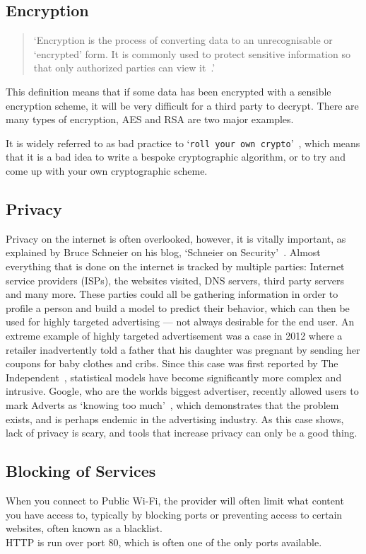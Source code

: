 \subsection{Encryption}
\begin{quotation}
    `Encryption is the process of converting data to an unrecognisable or
    `encrypted' form. It is commonly used to protect sensitive
    information so that only authorized parties can view it~\cite{dictenc}.'
\end{quotation}
This definition means that if some data has been encrypted with a sensible encryption scheme, it will be very difficult for a third party to decrypt.
There are many types of encryption, AES and RSA are two major examples.\par
It is widely referred to as bad practice to `\texttt{roll your own crypto}'~\cite{memtocrypto}, which means that it is a bad idea to write a bespoke cryptographic algorithm, or to try and come up with your own cryptographic scheme.

\subsection{Privacy}
Privacy on the internet is often overlooked, however, it is vitally important, as explained by Bruce Schneier on his blog, `Schneier on Security'~\cite{privacyrulez}. Almost everything that is done on the internet is tracked by multiple parties: Internet service providers (ISPs), the websites visited, DNS servers, third party servers and many more. These parties could all be gathering information in order to profile a person and build a model to predict their behavior, which can then be used for highly targeted advertising --- not always desirable for the end user. An extreme example of highly targeted advertisement was a case in 2012 where a retailer inadvertently told a father that his daughter was pregnant by sending her coupons for baby clothes and cribs.
Since this case was first reported by The Independent~\cite{babyshower}, statistical models have become significantly more complex and intrusive. Google, who are the worlds biggest advertiser, recently allowed users to mark Adverts as `knowing too much'~\cite{googlearewatching}, which demonstrates that the problem exists, and is perhaps endemic in the advertising industry.
As this case shows, lack of privacy is scary, and tools that increase privacy can only be a good thing.

\subsection{Blocking of Services}
When you connect to Public Wi-Fi, the provider will often limit what content you have access to, typically by blocking ports or preventing access to certain websites, often known as a blacklist.\\
HTTP is run over port 80, which is often one of the only ports available.


